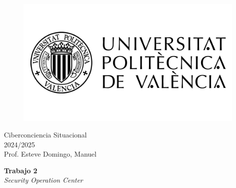 \begin{titlepage}
   \begin{figure}
      \vspace{50mm}
       \centering
       \includegraphics[keepaspectratio=true,width=0.40\columnwidth]{images/upvLogo.png}
   \end{figure}
   
   \vspace{40mm}
   \begin{center}
       \LARGE{Ciberconciencia Situacional}
       \vspace{2.5mm}
       \\ \large{2024/2025}
       \vspace{5mm}
       \\ \large{Prof. Esteve Domingo, Manuel}
   \end{center}
   
   \begin{center}
      \vspace{10mm}
       {\LARGE{\textbf{Trabajo 2}\\ \vspace{5mm}
       \textit{Security Operation Center}}}
       
   \end{center}
\end{titlepage}